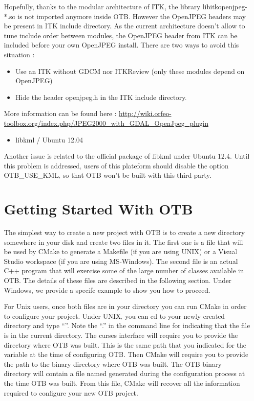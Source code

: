 Hopefully, thanks to the modular architecture of ITK, the library libitkopenjpeg-*.so is not imported anymore inside OTB.
However the OpenJPEG headers may be present in ITK include directory. As the current architecture doesn't allow to tune 
include order between modules, the OpenJPEG header from ITK can be included before your own OpenJPEG install. There are
two ways to avoid this situation :
\begin{itemize}
\item Use an ITK without GDCM nor ITKReview (only these modules depend on OpenJPEG)
\item Hide the header openjpeg.h in the ITK include directory.
\end{itemize}

More information can be found here : \url{http://wiki.orfeo-toolbox.org/index.php/JPEG2000_with_GDAL_OpenJpeg_plugin}

\begin{itemize}
\item  libkml / Ubuntu 12.04 
\end{itemize}

Another issue is related to the official package of libkml under Ubuntu 12.4.
Until this problem is addressed, users of this plateform should disable the option OTB\_USE\_KML, so that OTB won't be built with this third-party.


\section{Getting Started With OTB }
\label{sec:GettingStartedWithOTB}

The simplest way to create a new project with OTB is to create a new directory somewhere in your disk and create two files in it. The first one is a  file that will be used by CMake to generate a Makefile (if you are using UNIX) or a Visual Studio workspace (if you are using MS-Windows).  The second file is an actual C++ program that will exercise some of the large number of classes available in OTB. The details of these files are described in the following section. Under Windows, we provide a specifc example to show you how to proceed.  

For Unix users, once both files are in your directory you can run CMake in order to configure your project. Under UNIX, you can cd to your newly created directory and type ``''. Note the ``.'' in the command line for indicating that the  file is in the current directory. The curses interface will require you to provide the directory where OTB was built. This is the same path that you indicated for the  variable at the time of configuring OTB. Then CMake will require you to provide the path to the binary directory where OTB was built. The OTB binary directory will contain a file named  generated during the configuration process at the time OTB was built.  From this file, CMake will recover all the information required to configure your new OTB project.


